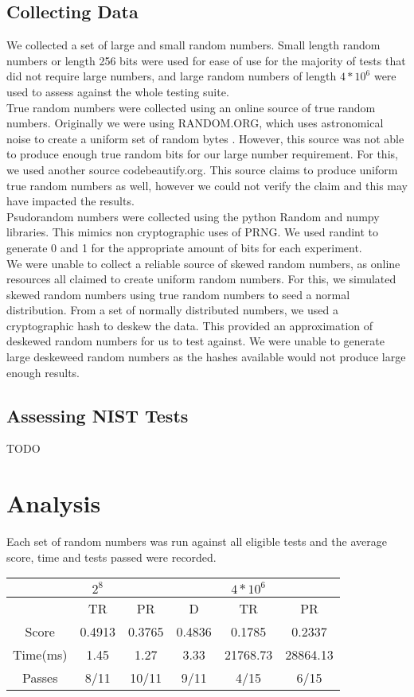 \documentclass[11pt,letterpaper,conference]{IEEEtran}
\begin{document}
\subsection{Collecting Data}
We collected a set of large and small random numbers. Small length random numbers or length 256 bits were used for ease of use for the majority of tests that did not require large numbers, and large random numbers of length $4*10^6$ were used to assess against the whole testing suite.\\
True random numbers were collected using an online source of true random numbers. Originally we were using RANDOM.ORG, which uses astronomical noise to create a uniform set of random bytes \cite{RANDOM.ORG}. However, this source was not able to produce enough true random bits for our large number requirement. For this, we used another source codebeautify.org. This source claims to produce uniform true random numbers as well, however we could not verify the claim and this may have impacted the results.\\

Psudorandom numbers were collected using the python Random and numpy libraries. This mimics non cryptographic uses of PRNG. We used randint to generate 0 and 1 for the appropriate amount of bits for each experiment.\\

We were unable to collect a reliable source of skewed random numbers, as online resources all claimed to create uniform random numbers. For this, we simulated skewed random numbers using true random numbers to seed a normal distribution. From a set of normally distributed numbers, we used a cryptographic hash to deskew the data. This provided an approximation of deskewed random numbers for us to test against. We were unable to generate large deskeweed random numbers as the hashes available would not produce large enough results.

\subsection{Assessing NIST Tests}
TODO

\section{Analysis}
Each set of random numbers was run against all eligible tests and the average score, time and tests passed were recorded. 
\begin{tabular}{|c|c|c|c|c|c|} \hline
 &$2^8$ & & &$4*10^6$ & \\ \hline
 &TR &PR &D &TR &PR \\ \hline
 Score &0.4913 &0.3765 &0.4836 &0.1785 &0.2337 \\ \hline
Time(ms) &1.45 &1.27 &3.33 &21768.73 &28864.13 \\ \hline
Passes &8/11 &10/11 &9/11 &4/15 &6/15 \\ \hline 
\end{tabular}
\end{document}

